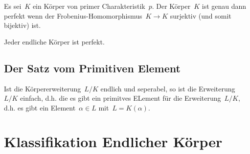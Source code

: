 \begin{proposition}
  Es sei~$K$ ein Körper von primer Charakteristik~$p$.
  Der Körper~$K$ ist genau dann perfekt wenn der Frobenius-Homomorphismus~$K \to K$ surjektiv (und somit bijektiv) ist. 
\end{proposition}

\begin{corollary}
  Jeder endliche Körper ist perfekt.
\end{corollary}



\subsection{Der Satz vom Primitiven Element}

\begin{definition}
  Ist die Körpererweiterung~$L/K$ endlich und seperabel, so ist die Erweiterung~$L/K$ einfach, d.h. die es gibt ein primitves ELement für die Erweiterung~$L/K$, d.h. es gibt ein Element~$\alpha \in L$ mit~$L = K(\alpha)$.
\end{definition}





\section{Klassifikation Endlicher Körper}






